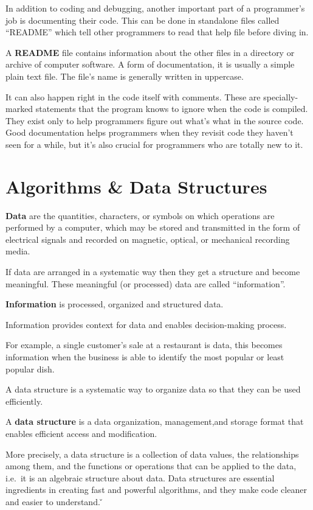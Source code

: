 In addition to coding and debugging, another important part of a programmer's job is documenting their code. This can
be done in standalone files called ``README'' which tell other programmers to read that help file before diving in.

\bd[README]
A \textbf{README} file contains information about the other files in a directory or archive of computer software. A
form of documentation, it is usually a simple plain text file. The file's name is generally written in uppercase.
\ed

It can also happen right in the code itself with comments. These are specially-marked statements that the program
knows to ignore when the code is compiled. They exist only to help programmers figure out what's what in the source
code. Good documentation helps programmers when they revisit code they haven't seen for a while, but it's also crucial
for programmers who are totally new to it.

\section{Algorithms \& Data Structures}

\bd[Data]
\textbf{Data} are the quantities, characters, or symbols on which operations are performed by a computer, which may
be stored and transmitted in the form of electrical signals and recorded on magnetic, optical, or mechanical
recording media.
\ed

If data are arranged in a systematic way then they get a structure and become meaningful. These meaningful (or
processed) data are called ``information''.

\bd[Information]
\textbf{Information} is processed, organized and structured data.
\ed

Information provides context for data and enables decision-making process.

\be
For example, a single customer's sale at a restaurant is data, this becomes information when the business is able to
identify the most popular or least popular dish.
\ee

A data structure is a systematic way to organize data so that they can be used efficiently.

A \textbf{data structure} is a data organization, management,and storage format that enables efficient access and
modification.
\ed

More precisely, a data structure is a collection of data values, the relationships among them, and the functions or
operations that can be applied to the data, i.e.\ it is an algebraic structure about data. Data structures are
essential ingredients in creating fast and powerful algorithms, and they make code cleaner and easier to understand. \v

